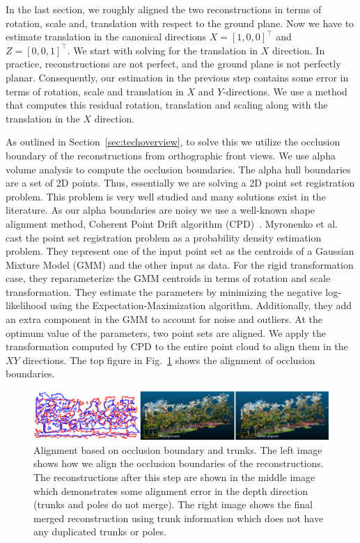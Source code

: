 In the last section, we roughly aligned the two reconstructions in terms of rotation, scale and, translation with respect to the ground plane. Now we have to estimate translation in the canonical directions $X = [1,0,0]^{\top}$ and $Z = [0, 0, 1]^{\top}$. We start with solving for the translation in $X$ direction. In practice, reconstructions are not perfect, and the ground plane is not perfectly planar. Consequently, our estimation in the previous step contains some error in terms of rotation, scale and translation in $X \text{ and } Y$-directions. We use a method that computes this residual rotation, translation and scaling along with the translation in the $X$ direction.


As outlined in Section~\ref{sec:techoverview}, to solve this we utilize the occlusion boundary of the reconstructions from orthographic front views. We use alpha volume analysis to compute the occlusion boundaries. The alpha hull boundaries are a set of 2D points. Thus, essentially we are solving a 2D point set registration problem. This problem is very well studied and many solutions exist in the literature. As our alpha boundaries are noisy we use a well-known shape alignment method, Coherent Point Drift algorithm (CPD)~\cite{myronenko2010point}. Myronenko et al.~\cite{myronenko2010point} cast the point set registration problem as a probability density estimation problem. They represent one of the input point set as the centroids of a Gaussian Mixture Model (GMM) and the other input as data. For the rigid transformation case, they reparameterize the GMM centroids in terms of rotation and scale transformation. They estimate the parameters by minimizing the negative log-likelihood using the Expectation-Maximization algorithm. Additionally, they add an extra component in the GMM to account for noise and outliers. At the optimum value of the parameters, two point sets are aligned. We apply the transformation computed by CPD to the entire point cloud to align them in the $XY$ directions. The top figure in Fig.~\ref{fig:occltrunk} shows the alignment of occlusion boundaries.

\begin{figure}[!htbp]
           \centering
    \includegraphics[width=0.99\columnwidth]{figures/merge_both/merging_result1.pdf}
    \caption[Alignment based on occlusion boundary and trunks.]{Alignment based on occlusion boundary and trunks. The left image shows how we align the occlusion boundaries of the reconstructions. The reconstructions after this step are shown in the middle image which demonstrates some alignment error in the depth direction (trunks and poles do not merge). The right image shows the final merged reconstruction using trunk information which does not have any duplicated trunks or poles.}
    \label{fig:occltrunk}
\end{figure}



